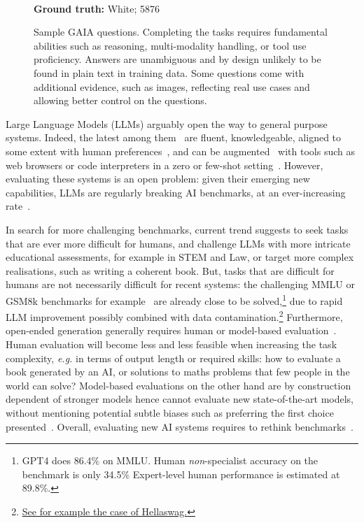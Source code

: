 \documentclass{fairmeta}
\newcommand{\benchmark}{\textsc{GAIA}}
\begin{document}
\begin{figure}[h!]
\begin{tcolorbox}[colframe=RoyalBlue, colback=white]
    \\
    \textbf{Ground truth:} White; 5876
    \end{tcolorbox}
    \caption{Sample \benchmark{} questions. Completing the tasks requires fundamental abilities such as reasoning, multi-modality handling, or tool use proficiency. Answers are unambiguous and by design unlikely to be found in plain text in training data.
    Some questions come with additional evidence, such as images, reflecting real use cases and allowing better control on the questions.}
    \label{fig:demo_questions}
\end{figure}

Large Language Models (LLMs) arguably open the way to general purpose systems. Indeed, the latest among them~\citep{openai2023gpt4, anthropic2023claude2, anil2023palm, touvron2023llama2} are fluent, knowledgeable, aligned to some extent with human preferences~\citep{ouyang2022training}, and can be augmented~\citep{mialon2023augmented} with tools such as web browsers or code interpreters in a zero or few-shot setting~\citep{brown2020language}. However, evaluating these systems is an open problem: given their emerging new capabilities, LLMs are regularly breaking AI benchmarks, at an ever-increasing rate~\citep{_kiela-etal-2023-plottingprogress}.

 
In search for more challenging benchmarks, current trend suggests to seek tasks that are ever more difficult for humans, and challenge LLMs with more intricate educational assessments, for example in STEM and Law, or target more complex realisations, such as writing a coherent book. But, tasks that are difficult for humans are not necessarily difficult for recent systems: the challenging MMLU or GSM8k benchmarks for example~\citep{_hendrycks-etal-2021-measuring-mmlu, cobbe2021training} are already close to be solved,\footnote{GPT4 does 86.4\% on MMLU. Human \emph{non}-specialist accuracy on the benchmark is only 34.5\% Expert-level human performance is estimated at 89.8\%.} due to rapid LLM improvement possibly combined with data contamination.\footnote{\href{https://www.surgehq.ai/blog/hellaswag-or-hellabad-36-of-this-popular-llm-benchmark-contains-errors}{See for example the case of Hellaswag.}}
Furthermore, open-ended generation generally requires human or model-based evaluation~\citep{zheng2023judging}. Human evaluation will become less and less feasible when increasing the task complexity, \textit{e.g.} in terms of output length or required skills: how to evaluate a book generated by an AI, or solutions to maths problems that few people in the world can solve? Model-based evaluations on the other hand are by construction dependent of stronger models hence cannot evaluate new state-of-the-art models, without mentioning potential subtle biases such as preferring the first choice presented~\citep{zheng2023judging}.
Overall, evaluating new AI systems requires to rethink benchmarks~\citep{chollet2019measure}.
\end{document}

